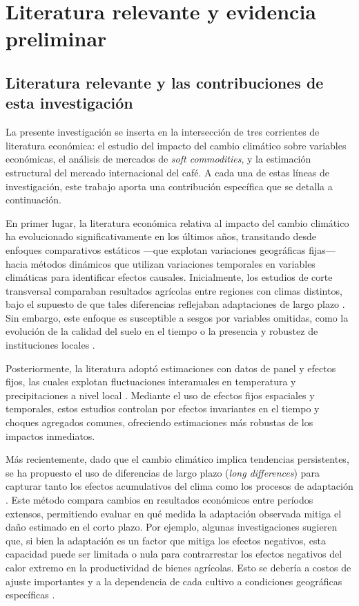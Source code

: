 \chapter{Literatura relevante y evidencia preliminar}

\label{chap:literatura}

\section{Literatura relevante y las contribuciones de esta investigación}

La presente investigación se inserta en la intersección de tres corrientes de literatura económica: el estudio del impacto del cambio climático sobre variables económicas, el análisis de mercados de \textit{soft commodities}, y la estimación estructural del mercado internacional del café. A cada una de estas líneas de investigación, este trabajo aporta una contribución específica que se detalla a continuación.

En primer lugar, la literatura económica relativa al impacto del cambio climático ha evolucionado significativamente en los últimos años, transitando desde enfoques comparativos estáticos —que explotan variaciones geográficas fijas— hacia métodos dinámicos que utilizan variaciones temporales en variables climáticas para identificar efectos causales. Inicialmente, los estudios de corte transversal comparaban resultados agrícolas entre regiones con climas distintos, bajo el supuesto de que tales diferencias reflejaban adaptaciones de largo plazo \citep{DeschenesGreenstone2007}. Sin embargo, este enfoque es susceptible a sesgos por variables omitidas, como la evolución de la calidad del suelo en el tiempo o la presencia y robustez de instituciones locales \citep{mundlak2001production,schlenker2009nonlinear}.

Posteriormente, la literatura adoptó estimaciones con datos de panel y efectos fijos, las cuales explotan fluctuaciones interanuales en temperatura y precipitaciones a nivel local \citep{burke2016adaptation}. Mediante el uso de efectos fijos espaciales y temporales, estos estudios controlan por efectos invariantes en el tiempo y choques agregados comunes, ofreciendo estimaciones más robustas de los impactos inmediatos.

Más recientemente, dado que el cambio climático implica tendencias persistentes, se ha propuesto el uso de diferencias de largo plazo (\textit{long differences}) para capturar tanto los efectos acumulativos del clima como los procesos de adaptación \citep{figari2025climate}. Este método compara cambios en resultados económicos entre períodos extensos, permitiendo evaluar en qué medida la adaptación observada mitiga el daño estimado en el corto plazo. Por ejemplo, algunas investigaciones sugieren que, si bien la adaptación es un factor que mitiga los efectos negativos, esta capacidad puede ser limitada o nula para contrarrestar los efectos negativos del calor extremo en la productividad de bienes agrícolas. Esto se debería a costos de ajuste importantes y a la dependencia de cada cultivo a condiciones geográficas específicas \citep{burke2016adaptation}.

